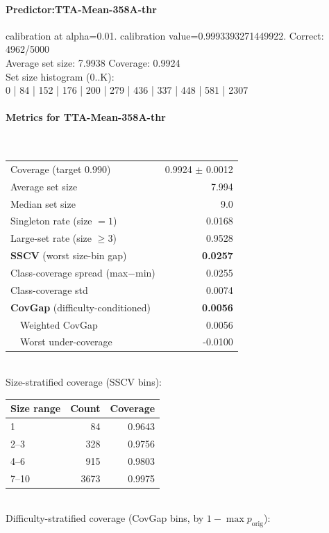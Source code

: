 \documentclass[parskip=half]{scrartcl}
\begin{document}
\paragraph{Predictor:TTA-Mean-358A-thr} calibration at alpha=0.01. calibration value=0.9993393271449922. Correct: 4962/5000\\
Average set size: 7.9938   Coverage: 0.9924\\
Set size histogram (0..K):\\
0 | 84 | 152 | 176 | 200 | 279 | 436 | 337 | 448 | 581 | 2307\\
\paragraph{Metrics for TTA-Mean-358A-thr}~\\
\begin{tabular}{l r}
\hline
Coverage (target 0.990) & 0.9924 $\pm$ 0.0012 \\
Average set size & 7.994 \\
Median set size & 9.0 \\
Singleton rate (size $=1$) & 0.0168 \\
Large-set rate (size $\geq 3$) & 0.9528 \\
\textbf{SSCV} (worst size-bin gap) & \textbf{0.0257} \\
Class-coverage spread (max$-$min) & 0.0255 \\
Class-coverage std & 0.0074 \\
\textbf{CovGap} (difficulty-conditioned) & \textbf{0.0056} \\
~~Weighted CovGap & 0.0056 \\
~~Worst under-coverage & -0.0100 \\
\hline
\end{tabular}\\[0.5em]
\textsf{\scriptsize Size-stratified coverage (SSCV bins):}\\
\begin{tabular}{l r r}
\hline
Size range & Count & Coverage \\
\hline
1 & 84 & 0.9643 \\
2--3 & 328 & 0.9756 \\
4--6 & 915 & 0.9803 \\
7--10 & 3673 & 0.9975 \\
\hline
\end{tabular}\\[0.5em]
\textsf{\scriptsize Difficulty-stratified coverage (CovGap bins, by $1-\max p_{\mathrm{orig}}$):}\\
\end{document}
